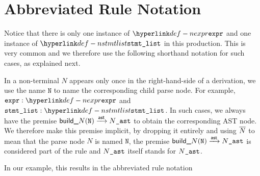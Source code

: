 \section{Abbreviated Rule Notation}
Notice that there is only one instance of $\Nexpr$ and one instance of $\Nstmtlist$ in this production.
This is very common and we therefore use the following shorthand notation for such cases, as explained next.

In a non-terminal $N$ appears only once in the right-hand-side of a derivation,
we use the name $\texttt{N}$ to name the corresponding child parse node.
For example, $\namednode{\vexpr}{\Nexpr}$ and $\namednode{\vstmtlist}{\Nstmtlist}$.
In such cases, we always have the premise $\textsf{build\_}N(\texttt{N}) \astarrow \astversion{N}$
to obtain the corresponding AST node.
We therefore make this premise implicit, by dropping it entirely and using $\astof{N}$ to mean that
the parse node $N$ is named $\texttt{N}$, the premise $\textsf{build\_}N(\texttt{N}) \astarrow \astversion{N}$
is considered part of the rule and $\astversion{N}$ itself stands for $\astversion{N}$.

In our example, this results in the abbreviated rule notation
\begin{mathpar}
\end{mathpar}

